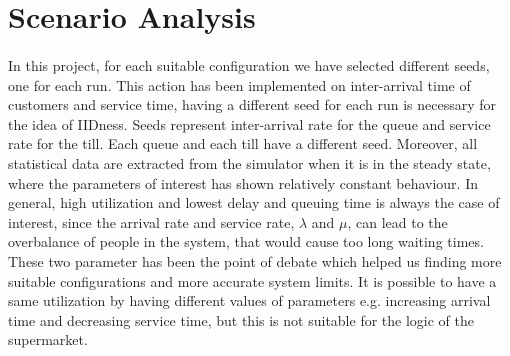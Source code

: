 \section{Scenario Analysis}
\paragraph{}
In this project, for each suitable configuration we have selected different seeds, one for each run. This action has been implemented on inter-arrival time of customers and service time, having a different seed for each run is necessary for the idea of IIDness. Seeds represent inter-arrival rate for the queue and service rate for the till. Each queue and each till have a different seed. Moreover, all statistical data are extracted from the simulator when it is in the steady state, where the parameters of interest has shown relatively constant behaviour. In general, high utilization and lowest delay and queuing time is always the case of interest, since the arrival rate and service rate, $\lambda$ and $\mu$, can lead to the overbalance of people in the system, that would cause too long waiting times. These two parameter has been the point of debate which helped us finding more suitable configurations and more accurate system limits. It is possible to have a same utilization by having different values of parameters e.g. increasing arrival time and decreasing service time, but this is not suitable for the logic of the supermarket.    





%
%